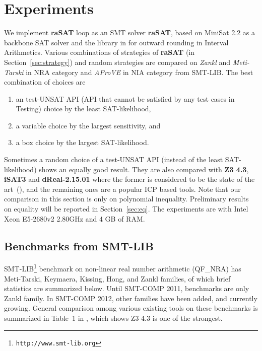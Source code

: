 \documentclass[runningheads,a4paper,oribibl]{llncs}
\begin{document}
\section{Experiments} \label{sec:experiment}

We implement \textbf{raSAT} loop as an SMT solver {\bf raSAT}, 
based on MiniSat 2.2 as a backbone SAT solver and the library in \cite{Al2012.14} for
outward rounding in Interval Arithmetics. 
Various combinations of strategies of {\bf raSAT} (in Section~\ref{sec:strategy})
and random strategies are compared on {\em Zankl} and {\em Meti-Tarski} in NRA category 
and {\em AProVE} in NIA category from SMT-LIB. 
The best combination of choices are 
\begin{enumerate}
\item an test-UNSAT API  (API that cannot be satisfied by any test cases in Testing) choice by the least SAT-likelihood, 
\item a variable choice by the largest sensitivity, and 
\item a box choice by the largest SAT-likelihood. 
\end{enumerate} 
Sometimes a random choice of a test-UNSAT API (instead of the least SAT-likelihood) 
shows an equally good result. 
They are also compared with \textbf{Z3 4.3}, \textbf{iSAT3} and \textbf{dReal-2.15.01}
where the former is considered to be the state of the art~(\cite{Jovanovic13}), and 
the remaining ones are a popular ICP based tools. 
Note that our comparison in this section is only on polynomial inequality.
Preliminary results on equality will be reported in Section~\ref{sec:eq}. 
The experiments are with Intel Xeon E5-2680v2 2.80GHz and 4 GB of RAM. 


\subsection{Benchmarks from SMT-LIB} \label{sec:expsmtlib}

SMT-LIB\footnote{\tt http://www.smt-lib.org} 
benchmark on non-linear real number arithmetic 
(QF\_NRA) has Meti-Tarski, Keymaera, Kissing, Hong, and Zankl families,
of which brief statistics are summarized below. 
Until SMT-COMP 2011, benchmarks are only Zankl family. 
In SMT-COMP 2012, other families have been added, and currently growing. 
General comparison among various existing tools on these benchmarks is summarized in 
Table~1 in \cite{Jovanovic13}, which shows Z3 4.3 is one of the strongest. 
\end{document}
